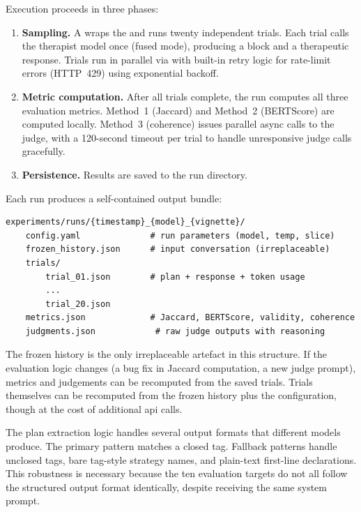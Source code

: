 Execution proceeds in three phases:

\begin{enumerate}
  \item \textbf{Sampling.} A  wraps the
     and runs twenty independent trials. Each trial
    calls the therapist model once (fused mode), producing a
     block and a therapeutic response. Trials run in
    parallel via  with built-in retry logic for
    rate-limit errors (HTTP~429) using exponential backoff.
  \item \textbf{Metric computation.} After all trials complete, the run
    computes all three evaluation metrics. Method~1 (Jaccard) and Method~2
    (BERTScore) are computed locally. Method~3 (coherence) issues parallel
    async calls to the  judge, with a 120-second timeout
    per trial to handle unresponsive judge calls gracefully.
  \item \textbf{Persistence.} Results are saved to the run directory.
\end{enumerate}

Each run produces a self-contained output bundle:

\begin{verbatim}
experiments/runs/{timestamp}_{model}_{vignette}/
    config.yaml              # run parameters (model, temp, slice)
    frozen_history.json      # input conversation (irreplaceable)
    trials/
        trial_01.json        # plan + response + token usage
        ...
        trial_20.json
    metrics.json             # Jaccard, BERTScore, validity, coherence
    judgments.json            # raw judge outputs with reasoning
\end{verbatim}

The frozen history is the only irreplaceable artefact in this structure.
If the evaluation logic changes (a bug fix in Jaccard computation, a new
judge prompt), metrics and judgements can be recomputed from the saved
trials. Trials themselves can be recomputed from the frozen history plus
the configuration, though at the cost of additional \gls{api} calls.

The plan extraction logic handles several output formats that different
models produce. The primary pattern matches a closed 
tag. Fallback patterns handle unclosed tags, bare tag-style strategy
names, and plain-text first-line declarations. This robustness is
necessary because the ten evaluation targets do not all follow the
structured output format identically, despite receiving the same system
prompt.

